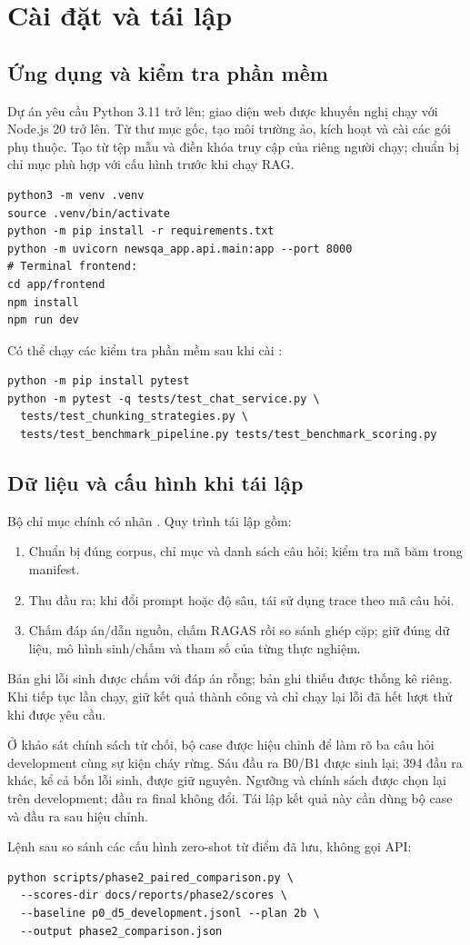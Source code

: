 \clearpage
\section{Cài đặt và tái lập}\label{app:reproduction}
\subsection{Ứng dụng và kiểm tra phần mềm}
Dự án yêu cầu Python 3.11 trở lên; giao diện web được khuyến nghị chạy với Node.js 20 trở lên. Từ thư mục gốc, tạo môi trường ảo, kích hoạt và cài các gói phụ thuộc. Tạo  từ tệp mẫu và điền khóa truy cập của riêng người chạy; chuẩn bị chỉ mục phù hợp với cấu hình trước khi chạy RAG.
\begin{Verbatim}[fontsize=\small]
python3 -m venv .venv
source .venv/bin/activate
python -m pip install -r requirements.txt
python -m uvicorn newsqa_app.api.main:app --port 8000
# Terminal frontend:
cd app/frontend
npm install
npm run dev
\end{Verbatim}
Có thể chạy các kiểm tra phần mềm sau khi cài :
\begin{Verbatim}[fontsize=\small]
python -m pip install pytest
python -m pytest -q tests/test_chat_service.py \
  tests/test_chunking_strategies.py \
  tests/test_benchmark_pipeline.py tests/test_benchmark_scoring.py
\end{Verbatim}
\subsection{Dữ liệu và cấu hình khi tái lập}
Bộ chỉ mục chính có nhãn . Quy trình tái lập gồm:
\begin{enumerate}
\item Chuẩn bị đúng corpus, chỉ mục và danh sách câu hỏi; kiểm tra mã băm trong manifest.
\item Thu đầu ra; khi đổi prompt hoặc độ sâu, tái sử dụng trace theo mã câu hỏi.
\item Chấm đáp án/dẫn nguồn, chấm RAGAS rồi so sánh ghép cặp; giữ đúng dữ liệu, mô hình sinh/chấm và tham số của từng thực nghiệm.
\end{enumerate}

Bản ghi lỗi sinh được chấm với đáp án rỗng; bản ghi thiếu được thống kê riêng. Khi tiếp tục lần chạy, giữ kết quả thành công và chỉ chạy lại lỗi đã hết lượt thử khi được yêu cầu.

Ở khảo sát chính sách từ chối, bộ case được hiệu chỉnh để làm rõ ba câu hỏi development cùng sự kiện cháy rừng. Sáu đầu ra B0/B1 được sinh lại; 394 đầu ra khác, kể cả bốn lỗi sinh, được giữ nguyên. Ngưỡng và chính sách được chọn lại trên development; đầu ra final không đổi. Tái lập kết quả này cần dùng bộ case và đầu ra sau hiệu chỉnh.

Lệnh sau so sánh các cấu hình zero-shot từ điểm đã lưu, không gọi API:
\begin{Verbatim}[fontsize=\small]
python scripts/phase2_paired_comparison.py \
  --scores-dir docs/reports/phase2/scores \
  --baseline p0_d5_development.jsonl --plan 2b \
  --output phase2_comparison.json
\end{Verbatim}
